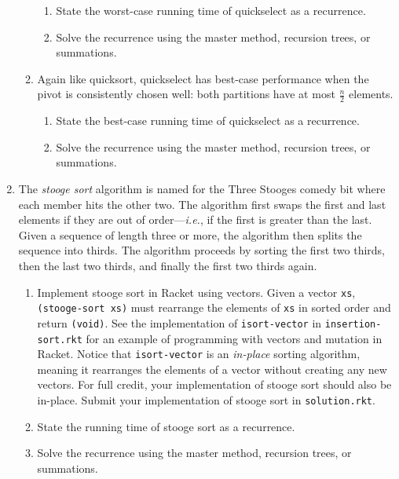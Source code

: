\documentclass{article}
\begin{document}
\begin{enumerate}
\begin{enumerate}
    \begin{enumerate}
    \item State the worst-case running time of quickselect as a recurrence.
    \item Solve the recurrence using the master method, recursion trees, or
      summations.
    \end{enumerate}
  \item
    Again like quicksort, quickselect has best-case performance when the pivot
    is consistently chosen well: both partitions have at most \(\frac{n}{2}\)
    elements.
    \begin{enumerate}
    \item State the best-case running time of quickselect as a recurrence.
    \item Solve the recurrence using the master method, recursion trees, or
      summations.
    \end{enumerate}
  \end{enumerate}

  \pagebreak[2]
\item
  The \emph{stooge sort} algorithm is named for the Three Stooges comedy bit
  where each member hits the other two.  The algorithm first swaps the first and
  last elements if they are out of order---\emph{i.e.}, if the first is greater
  than the last.  Given a sequence of length three or more, the algorithm then
  splits the sequence into thirds.  The algorithm proceeds by sorting the first
  two thirds, then the last two thirds, and finally the first two thirds again.
  \begin{enumerate}
  \item Implement stooge sort in Racket using vectors.  Given a vector
    \texttt{xs}, \mbox{\texttt{(stooge-sort~xs)}} must rearrange the elements of
    \texttt{xs} in sorted order and return \texttt{(void)}.  See the
    implementation of \texttt{isort-vector} in \texttt{insertion-sort.rkt} for
    an example of programming with vectors and mutation in Racket.  Notice that
    \texttt{isort-vector} is an \emph{in-place} sorting algorithm, meaning it
    rearranges the elements of a vector without creating any new vectors.  For
    full credit, your implementation of stooge sort should also be in-place.
    Submit your implementation of stooge sort in \texttt{solution.rkt}.
  \item State the running time of stooge sort as a recurrence.
  \item Solve the recurrence using the master method, recursion trees, or
    summations.
  \end{enumerate}


\end{enumerate}
\end{document}
